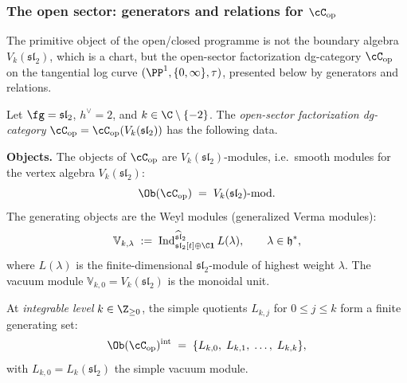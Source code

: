 \subsubsection{The open sector: generators and relations for
 \texorpdfstring{$\cC_{\mathrm{op}}$}{C\_op}}
\label{subsubsec:benchmark-open-sector}

The primitive object of the open/closed programme is not the
boundary algebra $V_k(\mathfrak{sl}_2)$, which is a chart,
but the open-sector factorization dg-category
$\cC_{\mathrm{op}}$ on the tangential log curve
$(\PP^1, \{0,\infty\}, \tau)$, presented below by generators
and relations.

\begin{definition}
\label{def:benchmark-Cop-sl2}
Let $\fg = \mathfrak{sl}_2$, $h^\vee = 2$, and
$k \in \C \setminus \{-2\}$. The \emph{open-sector
factorization dg-category}
$\cC_{\mathrm{op}} = \cC_{\mathrm{op}}(V_k(\mathfrak{sl}_2))$
has the following data.

\medskip\noindent
\textbf{Objects.}
The objects of $\cC_{\mathrm{op}}$ are
$V_k(\mathfrak{sl}_2)$-modules, i.e.\ smooth modules for the
vertex algebra $V_k(\mathfrak{sl}_2)$:
\begin{equation}\label{eq:benchmark-Cop-objects}
 \Ob(\cC_{\mathrm{op}})
 \;=\;
 V_k(\mathfrak{sl}_2)\text{-}\mathrm{mod}.
\end{equation}
The generating objects are the Weyl modules
(generalized Verma modules):
\begin{equation}\label{eq:benchmark-Cop-generators}
 \mathbb{V}_{k,\lambda}
 \;:=\;
 \operatorname{Ind}_{\mathfrak{sl}_2[t] \oplus \C\mathbf{1}}^{\widehat{\mathfrak{sl}}_2}
 L(\lambda),
 \qquad \lambda \in \mathfrak{h}^*,
\end{equation}
where $L(\lambda)$ is the finite-dimensional
$\mathfrak{sl}_2$-module of highest weight $\lambda$.
The vacuum module $\mathbb{V}_{k,0} = V_k(\mathfrak{sl}_2)$
is the monoidal unit.

At \emph{integrable level} $k \in \Z_{\ge 0}$, the simple
quotients $L_{k,j}$ for $0 \le j \le k$ form a finite
generating set:
\begin{equation}\label{eq:benchmark-Cop-integrable-objects}
 \Ob(\cC_{\mathrm{op}})^{\mathrm{int}}
 \;=\;
 \{L_{k,0},\; L_{k,1},\; \ldots,\; L_{k,k}\},
\end{equation}
with $L_{k,0} = L_k(\mathfrak{sl}_2)$ the simple vacuum module.


\end{definition}
